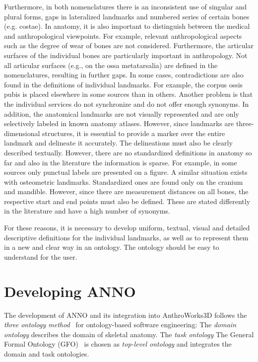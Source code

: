 \documentclass[sw]{iosart2x}
\newcommand{\aw}{AnthroWorks3D}
\begin{document}
Furthermore, in both nomenclatures there is an inconsistent use of singular and plural forms, gaps in lateralized landmarks and numbered series of certain bones (e.g. costae).
In anatomy, it is also important to distinguish between the medical and anthropological viewpoints.
For example, relevant anthropological aspects such as the degree of wear of bones are not considered.
Furthermore, the articular surfaces of the individual bones are particularly important in anthropology.
Not all articular surfaces (e.g., on the ossa metatarsalia) are defined in the nomenclatures, resulting in further gaps.
In some cases, contradictions are also found in the definitions of individual landmarks.
For example, the corpus ossis pubis is placed elsewhere in some sources than in others.
Another problem is that the individual services do not synchronize and do not offer enough synonyms. %
In addition, the anatomical landmarks are not visually represented and are only selectively labeled in known anatomy atlases.
However, since landmarks are three-dimensional structures, it is essential to provide a marker over the entire landmark and delineate it accurately.
The delineations must also be clearly described textually.
However, there are no standardized definitions in anatomy so far and also in the literature the information is sparse.
For example, in some sources only punctual labels are presented on a figure.
A similar situation exists with osteometric landmarks.
Standardized ones are found only on the cranium and mandible.
However, since there are measurement distances on all bones, the respective start and end points must also be defined.
These are stated differently in the literature and have a high number of synonyms.

For these reasons, it is necessary to develop uniform, textual, visual and detailed descriptive definitions for the individual landmarks, as well as to represent them in a new and clear way in an ontology.
The ontology should be easy to understand for the user.



\section{Developing ANNO}
The development of ANNO and its integration into \aw{} follows the \emph{three ontology method}~\citep{threeontologymethod} for ontology-based software engineering:
The \emph{domain ontology} describes the domain of skeletal anatomy.
The \emph{task ontology}
The General Formal Ontology (GFO)~\citep{gfo} is chosen as \emph{top-level ontology} and integrates the domain and task ontologies.
\end{document}
